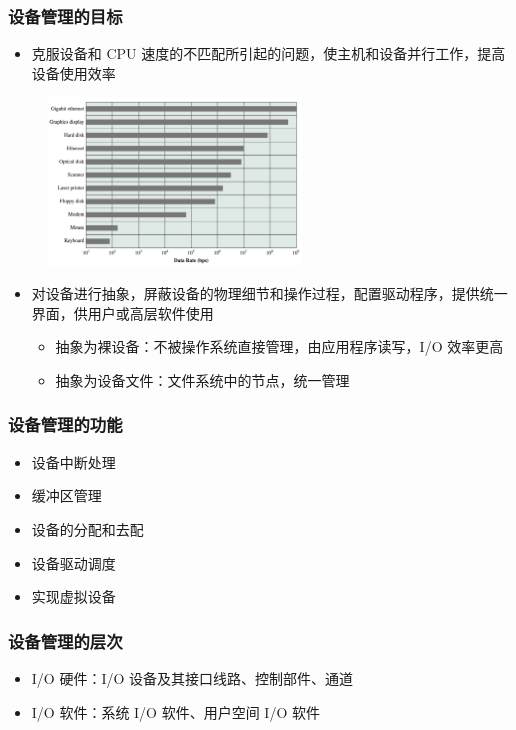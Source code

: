 \documentclass[cs4size,a4paper,10pt]{ctexart}
\begin{document}
	\subsubsection{设备管理的目标}
	\begin{itemize}
		\item 克服设备和 CPU 速度的不匹配所引起的问题，使主机和设备并行工作，提高设备使用效率
	\end{itemize}
	\begin{figure}[H]
		\centering
		\includegraphics[width=0.6\textwidth]{img/4.1.1.3}
	\end{figure}
	\begin{itemize}
		\item 对设备进行抽象，屏蔽设备的物理细节和操作过程，配置驱动程序，提供统一界面，供用户或高层软件使用
		\begin{itemize}
			\item 抽象为裸设备：不被操作系统直接管理，由应用程序读写，I/O 效率更高
			\item 抽象为设备文件：文件系统中的节点，统一管理
		\end{itemize}
	\end{itemize}

	\subsubsection{设备管理的功能}
	\begin{itemize}
		\item 设备中断处理
		\item 缓冲区管理
		\item 设备的分配和去配
		\item 设备驱动调度
		\item 实现虚拟设备
	\end{itemize}

	\subsubsection{设备管理的层次}
	\begin{itemize}
		\item I/O 硬件：I/O 设备及其接口线路、控制部件、通道
		\item I/O 软件：系统 I/O 软件、用户空间 I/O 软件
	\end{itemize}
\end{document}
